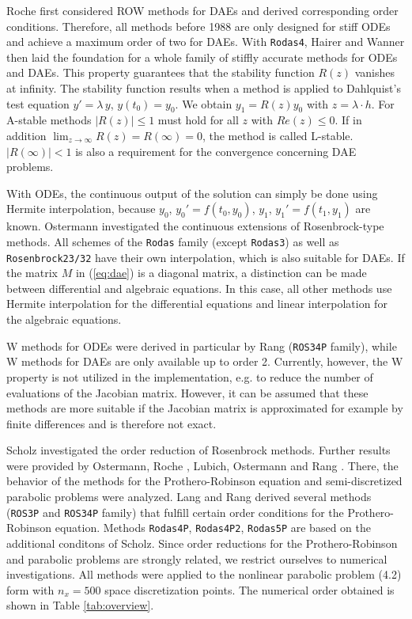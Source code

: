 \documentclass{juliacon}
\begin{document}
Roche \cite{roche} first considered ROW methods for DAEs and derived corresponding order conditions. 
Therefore, all methods before 1988 are only designed for stiff ODEs and achieve a maximum order of two for DAEs.
With \verb|Rodas4|, Hairer and Wanner \cite{hairer} then laid the foundation for a whole family of stiffly accurate methods for ODEs and DAEs. 
This property guarantees that the stability function $R(z)$ vanishes at infinity.
The stability function results when a method is applied to Dahlquist's test equation $y' = \lambda \, y$, $y(t_0)=y_0$. We obtain
$y_1 = R(z) y_0$ with $z = \lambda \cdot h$.
For A-stable methods $|R(z)| \leq 1$ must hold for all $z$ with $Re(z) \leq 0$. If in addition $\lim_{z \to \infty} R(z) = R(\infty)=0$, the method is called L-stable.
$|R(\infty)| < 1$ is also a requirement for the convergence concerning DAE problems.

With ODEs, the continuous output of the solution can simply be done using Hermite interpolation, because $y_0$, $y_0' = f(t_0,y_0)$, $y_1$, $y_1'=f(t_1,y_1)$ are known.
Ostermann \cite{ostermann} investigated the continuous extensions of Rosenbrock-type methods. All schemes of the \verb|Rodas| family (except \verb|Rodas3|) as well as  
\verb|Rosenbrock23/32| have their own interpolation, which is also suitable for DAEs.
If the matrix $M$ in (\ref{eq:dae}) is a diagonal matrix, a distinction can be made between differential and algebraic equations. 
In this case, all other methods use Hermite interpolation for the differential equations and linear interpolation for the algebraic equations.

W methods for ODEs were derived in particular by Rang (\verb|ROS34P| family), while W methods for DAEs are only available up to order 2. 
Currently, however, the W property is not utilized in the implementation, e.g. to reduce the number of evaluations of the Jacobian matrix.
However, it can be assumed that these methods are more suitable if the Jacobian matrix is approximated for example by finite differences and is therefore not exact.

Scholz \cite{scholz} investigated the order reduction of Rosenbrock methods. Further results were provided by Ostermann, Roche \cite{oro}, 
Lubich, Ostermann \cite{luos} and Rang \cite{rang2}.
There, the behavior of the methods for the Prothero-Robinson equation and semi-discretized parabolic problems were analyzed. 
Lang and Rang derived several methods (\verb|ROS3P| and \verb|ROS34P| family) that fulfill certain order conditions for the Prothero-Robinson equation. 
Methods \verb|Rodas4P|, \verb|Rodas4P2|, \verb|Rodas5P| are based on the additional conditons of Scholz.
Since order reductions for the Prothero-Robinson and parabolic problems are strongly related, we restrict ourselves to numerical investigations.
All methods were applied to the nonlinear parabolic problem (4.2) form \cite{rodas5p} with $n_x = 500$ space discretization points.
The numerical order obtained is shown in Table \ref{tab:overview}.
\end{document}
